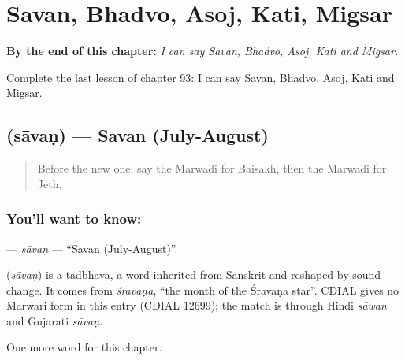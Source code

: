 
\chapter{Savan, Bhadvo, Asoj, Kati, Migsar}
\label{ch:mw-savan-bhadvo-asoj-kati-migsar}

\begin{chapteropening}
\textbf{By the end of this chapter:} \emph{I can say Savan, Bhadvo, Asoj, Kati and Migsar.}

Complete the last lesson of chapter 93: I can say Savan, Bhadvo, Asoj, Kati and Migsar.
\end{chapteropening}

\section[\texorpdfstring{\mw{सावण} (sāvaṇ)}{सावण (sāvaṇ)}]{ (sāvaṇ) — Savan (July-August)}

\label{lesson:MW-C93-savan}



\begin{quote}
Before the new one: say the Marwadi for Baisakh, then the Marwadi for Jeth.
\end{quote}

\subsection*{You'll want to know: }
\textbf{} — \emph{sāvaṇ} — \textquotedblleft{}Savan (July-August)\textquotedblright{}.

\begin{cousinweb}
\textbf{} (\emph{sāvaṇ}) is a tadbhava, a word inherited from Sanskrit and reshaped by sound change. It comes from \emph{śrāvaṇa}, \textquotedblleft{}the month of the Śravaṇa star\textquotedblright{}. CDIAL gives no Marwari form in this entry (CDIAL 12699); the match is through Hindi \emph{sāwan} and Gujarati \emph{sāvaṇ}.
\end{cousinweb}

\begin{grammarlens}[title={What you've built}]
One more word for this chapter.
\end{grammarlens}

